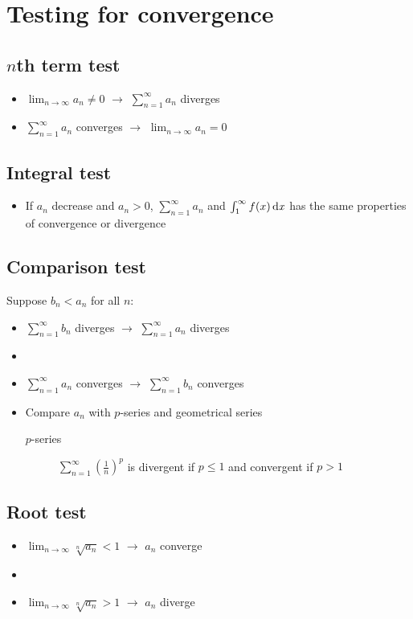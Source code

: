 \section{Testing for convergence}
\subsection{$n$th term test}
\begin{itemize}
    \item $\lim_{n\rightarrow\infty}a_n \neq 0$ $\rightarrow$ $\sum_{n=1}^{\infty}a_n$ diverges
    \item $\sum_{n=1}^{\infty}a_n$ converges $\rightarrow$ $\lim_{n\rightarrow\infty}a_n = 0$
\end{itemize}

\subsection{Integral test}
\begin{itemize}
    \item If $a_n$ decrease and $a_n>0$, $\sum_{n=1}^{\infty}a_n$ and $\int_{1}^{\infty} f(x) \operatorname{\mathrm{d}\mathit{x}}$
    has the same properties of convergence or divergence
\end{itemize}

\subsection{Comparison test}
Suppose $b_n<a_n$ for all $n$:
\begin{itemize}
    \item $\sum_{n=1}^{\infty}b_n$ diverges $\rightarrow$ $\sum_{n=1}^{\infty}a_n$ diverges
    \item \item $\sum_{n=1}^{\infty}a_n$ converges $\rightarrow$ $\sum_{n=1}^{\infty}b_n$ converges
    \item Compare $a_n$ with $p$-series and geometrical series
    \begin{description}
        \item[$p$-series] $\sum_{n=1}^{\infty} \left(\frac{1}{n}\right)^p$ is divergent if $p\leq 1$ and 
        convergent if $p>1$
    \end{description}
\end{itemize}

\subsection{Root test}
\begin{itemize}
    \item $\lim_{n\rightarrow\infty}\sqrt[n]{a_n} < 1$ $\rightarrow$ $a_n$ converge
    \item \item $\lim_{n\rightarrow\infty}\sqrt[n]{a_n} > 1$ $\rightarrow$ $a_n$ diverge
\end{itemize}

